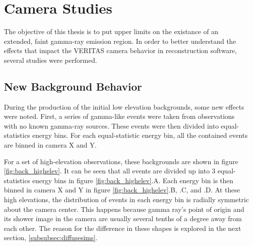 \section{Camera Studies}
The objective of this thesis is to put upper limits on the existance of an extended, faint gamma-ray emission region.
In order to better understand the effects that impact the VERITAS camera behavior in reconstruction software, several studies were performed.

\subsection{New Background Behavior}

During the production of the initial low elevation backgrounds, some new effects were noted.
First, a series of gamma-like events were taken from observations with no known gamma-ray sources.
These events were then divided into equal-statistics energy bins.
For each equal-statistic energy bin, all the contained events are binned in camera X and Y.

For a set of high-elevation observations, these backgrounds are shown in figure \ref{fig:back_highelev}.
It can be seen that all events are divided up into 3 equal-statistics energy bins in figure \ref{fig:back_highelev}.A.
Each energy bin is then binned in camera X and Y in figure \ref{fig:back_highelev}.B, .C, and .D.
At these high elevations, the distribution of events in each energy bin is radially symmetric about the camera center.
This happens because gamma ray's point of origin and its shower image in the camera are usually several tenths of a degree away from each other.
The reason for the difference in these shapes is explored in the next section, \ref{subsubsec:diffusesims}.

